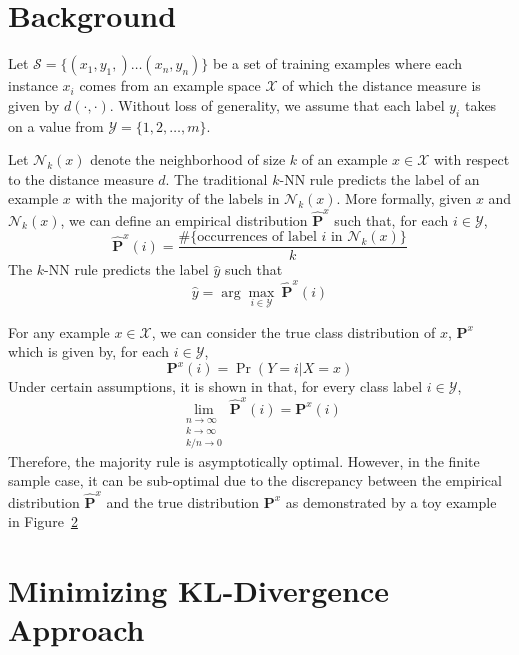 \documentclass{article}
\begin{document}
\section{Background}
\label{sec:background}

\newcommand{\X}{\mathcal{X}}
\newcommand{\Y}{\mathcal{Y}}
\newcommand{\trainset}{\mathcal{S}}

Let $\trainset = \{ (x_1,y_1,) \ldots (x_n,y_n)\}$ be a set of
training examples where each instance $x_i$ comes from an example
space $\X$ of which the distance measure is given by
$d(\cdot,\cdot)$. Without loss of generality, we assume that each
label $y_i$ takes on a value from $\Y = \{1,2,\ldots,m\}$.

\newcommand{\nh}{\mathcal{N}}
\newcommand{\Pemp}{\widehat{\mathbf{P}}^x}
\newcommand{\Ptrue}{\mathbf{P}^x}

Let $\nh_k(x)$ denote the neighborhood of size $k$ of an example $x
\in \X$ with respect to the distance measure $d$. The traditional
$k$-NN rule predicts the label of an example $x$ with the majority of
the labels in $\nh_k(x)$. More formally, given $x$ and $\nh_k(x)$, we
can define an empirical distribution $\Pemp$ such that, for each $i \in \Y$, 
\[
\Pemp(i) = \frac{\#\{ \mbox{occurrences of label } i \mbox{ in } \nh_k(x)\}}{k}
\]
The $k$-NN rule predicts the label $\hat{y}$ such that
\[
\hat{y} = \arg\max_{i \in \Y} \: \Pemp(i)
\]

For any example $x \in \X$, we can consider the true class
distribution of $x$, $\Ptrue$ which is given by, for each $i \in \Y$,
\[
\Ptrue(i) = \Pr(Y=i | X=x)
\]
Under certain assumptions, it is shown in \cite{Fix1951} that,
for every class label $i \in \Y$, 
\[
\lim_{\substack{n \to \infty\\k \to \infty\\k/n \to 0}} \Pemp(i) = \Ptrue(i)
\]
Therefore, the majority rule is asymptotically optimal. However, in
the finite sample case, it can be sub-optimal due to the discrepancy
between the empirical distribution $\Pemp$ and the true distribution
$\Ptrue$ as demonstrated by a toy example in Figure~\ref{}

\section{Minimizing KL-Divergence Approach}

\newcommand{\dkl}{D_{\mathrm{KL}}}
\newcommand{\Qemp}{\widehat{\mathbf{Q}}^j}
\newcommand{\Qtrue}{\mathbf{Q}^j}

\end{document}
